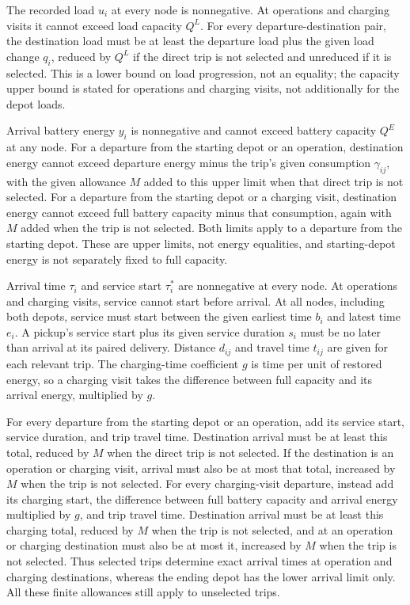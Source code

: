 \documentclass[10pt]{article}
\begin{document}
The recorded load $u_i$ at every node is nonnegative. At operations and charging visits it cannot exceed load capacity $Q^L$. For every departure-destination pair, the destination load must be at least the departure load plus the given load change $q_i$, reduced by $Q^L$ if the direct trip is not selected and unreduced if it is selected. This is a lower bound on load progression, not an equality; the capacity upper bound is stated for operations and charging visits, not additionally for the depot loads.

Arrival battery energy $y_i$ is nonnegative and cannot exceed battery capacity $Q^E$ at any node. For a departure from the starting depot or an operation, destination energy cannot exceed departure energy minus the trip's given consumption $\gamma_{ij}$, with the given allowance $M$ added to this upper limit when that direct trip is not selected. For a departure from the starting depot or a charging visit, destination energy cannot exceed full battery capacity minus that consumption, again with $M$ added when the trip is not selected. Both limits apply to a departure from the starting depot. These are upper limits, not energy equalities, and starting-depot energy is not separately fixed to full capacity.

Arrival time $\tau_i$ and service start $\tau_i^*$ are nonnegative at every node. At operations and charging visits, service cannot start before arrival. At all nodes, including both depots, service must start between the given earliest time $b_i$ and latest time $e_i$. A pickup's service start plus its given service duration $s_i$ must be no later than arrival at its paired delivery. Distance $d_{ij}$ and travel time $t_{ij}$ are given for each relevant trip. The charging-time coefficient $g$ is time per unit of restored energy, so a charging visit takes the difference between full capacity and its arrival energy, multiplied by $g$.

For every departure from the starting depot or an operation, add its service start, service duration, and trip travel time. Destination arrival must be at least this total, reduced by $M$ when the direct trip is not selected. If the destination is an operation or charging visit, arrival must also be at most that total, increased by $M$ when the trip is not selected. For every charging-visit departure, instead add its charging start, the difference between full battery capacity and arrival energy multiplied by $g$, and trip travel time. Destination arrival must be at least this charging total, reduced by $M$ when the trip is not selected, and at an operation or charging destination must also be at most it, increased by $M$ when the trip is not selected. Thus selected trips determine exact arrival times at operation and charging destinations, whereas the ending depot has the lower arrival limit only. All these finite allowances still apply to unselected trips.
\end{document}
